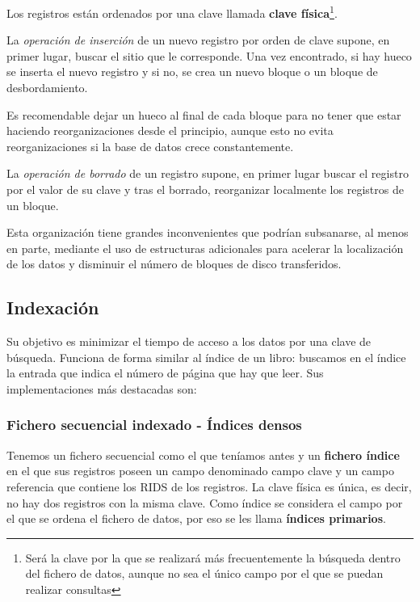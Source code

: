 \documentclass[10pt,a4paper,spanish]{report}
\begin{document}
Los registros están ordenados por una clave llamada \textbf{\textcolor[rgb]{1,0.2,0.3}{clave física}}\footnote{Será la clave por la que se realizará más frecuentemente la búsqueda dentro del fichero de datos, aunque no sea el único campo por el que se puedan realizar consultas}.

La \textcolor[rgb]{1,0.2,0.3}{\textit{operación de inserción}} de un nuevo registro por orden de clave supone, en primer lugar, buscar el sitio que le corresponde. Una vez encontrado, si hay hueco se inserta el nuevo registro y si no, se crea un nuevo bloque o un bloque de desbordamiento.

Es recomendable dejar un hueco al final de cada bloque para no tener que estar haciendo reorganizaciones desde el principio, aunque esto no evita reorganizaciones si la base de datos crece constantemente.

La \textcolor[rgb]{1,0.2,0.3}{\textit{operación de borrado}} de un registro supone, en primer lugar buscar el registro por el valor de su clave y tras el borrado, reorganizar localmente los registros de un bloque.

Esta organización tiene grandes inconvenientes que podrían subsanarse, al menos en parte, mediante el uso de estructuras adicionales para acelerar la localización de los datos y disminuir el número de bloques de disco transferidos.

\begin{center}

\end{center}

\textcolor[rgb]{1,0.2,0.3}{\subsection{Indexación}}
Su objetivo es minimizar el tiempo de acceso a los datos por una clave de búsqueda. Funciona de forma similar al índice de un libro: buscamos en el índice la entrada que indica el número de página que hay que leer. Sus implementaciones más destacadas son:

\textcolor[rgb]{1,0.2,0.3}{\subsubsection{Fichero secuencial indexado - Índices densos}}
Tenemos un fichero secuencial como el que teníamos antes y un \textcolor[rgb]{1,0.2,0.3}{\textbf{fichero índice}} en el que sus registros poseen un campo denominado campo clave y un campo referencia que contiene los RIDS de los registros. La clave física es única, es decir, no hay dos registros con la misma clave. Como índice se considera el campo por el que se ordena el fichero de datos, por eso se les llama \textbf{\textcolor[rgb]{1,0.2,0.3}{índices primarios}}.
\end{document}
